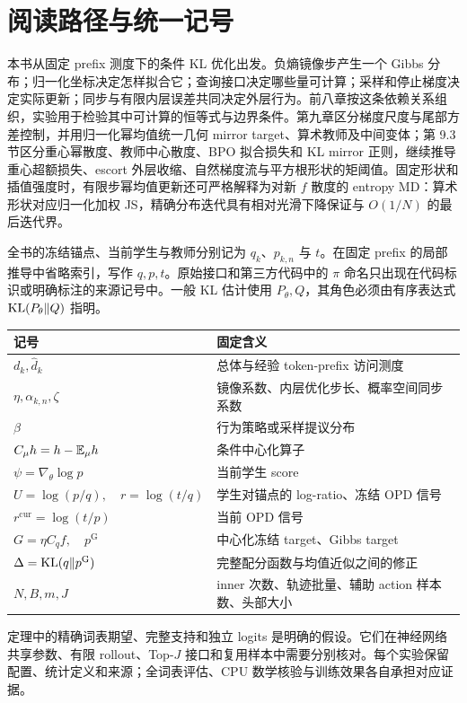\chapter*{阅读路径与统一记号}
本书从固定 prefix 测度下的条件 KL 优化出发。负熵镜像步产生一个 Gibbs 分布；归一化坐标决定怎样拟合它；查询接口决定哪些量可计算；采样和停止梯度决定实际更新；同步与有限内层误差共同决定外层行为。前八章按这条依赖关系组织，实验用于检验其中可计算的恒等式与边界条件。第九章区分梯度尺度与尾部方差控制，并用归一化幂均值统一几何 mirror target、算术教师及中间变体；第 9.3 节区分重心幂散度、教师中心散度、BPO 拟合损失和 KL mirror 正则，继续推导重心超额损失、escort 外层收缩、自然梯度流与平方根形状的矩阈值。固定形状和插值强度时，有限步幂均值更新还可严格解释为对新 $f$ 散度的 entropy MD：算术形状对应归一化加权 JS，精确分布迭代具有相对光滑下降保证与 $O(1/N)$ 的最后迭代界。

全书的冻结锚点、当前学生与教师分别记为 $q_k$、$p_{k,n}$ 与 $t$。在固定 prefix 的局部推导中省略索引，写作 $q,p,t$。原始接口和第三方代码中的 $\pi$ 命名只出现在代码标识或明确标注的来源记号中。一般 KL 估计使用 $P_\theta,Q$，其角色必须由有序表达式 $\operatorname{KL}(P_\theta\Vert Q)$ 指明。

\begin{center}
\begin{tabular}{ll}
\toprule
记号 & 固定含义\\
\midrule
$d_k,\widehat d_k$ & 总体与经验 token-prefix 访问测度\\
$\eta,\alpha_{k,n},\zeta$ & 镜像系数、内层优化步长、概率空间同步系数\\
$\beta$ & 行为策略或采样提议分布\\
$C_\mu h=h-\mathbb E_\mu h$ & 条件中心化算子\\
$\psi=\nabla_\theta\log p$ & 当前学生 score\\
$U=\log(p/q),\quad r=\log(t/q)$ & 学生对锚点的 log-ratio、冻结 OPD 信号\\
$r^{\mathrm{cur}}=\log(t/p)$ & 当前 OPD 信号\\
$G=\eta C_q f,\quad p^{\mathrm G}$ & 中心化冻结 target、Gibbs target\\
$\Delta=\operatorname{KL}(q\Vert p^{\mathrm G})$ & 完整配分函数与均值近似之间的修正\\
$N,B,m,J$ & inner 次数、轨迹批量、辅助 action 样本数、头部大小\\
\bottomrule
\end{tabular}
\end{center}

定理中的精确词表期望、完整支持和独立 logits 是明确的假设。它们在神经网络共享参数、有限 rollout、Top-$J$ 接口和复用样本中需要分别核对。每个实验保留配置、统计定义和来源；全词表评估、CPU 数学核验与训练效果各自承担对应证据。
